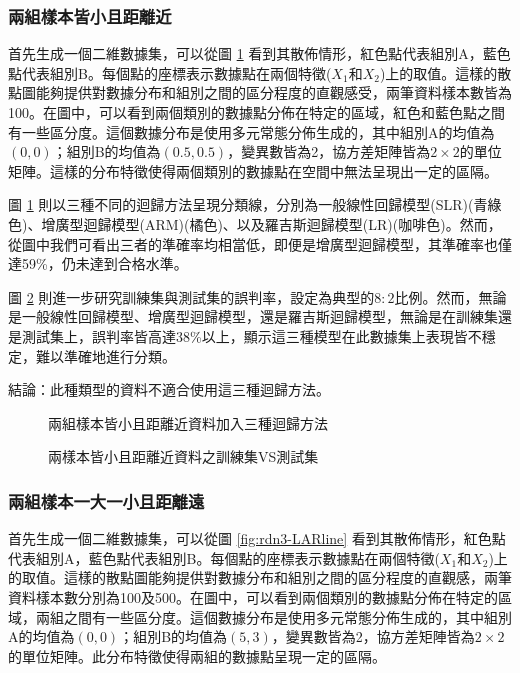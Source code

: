 \documentclass[12pt, a4paper]{article}
\begin{document}
\subsubsection{兩組樣本皆小且距離近}
首先生成一個二維數據集，可以從圖 \ref{fig:rdn2-LARline} 看到其散佈情形，紅色點代表組別A，藍色點代表組別B。每個點的座標表示數據點在兩個特徵($X_1$和$X_2$)上的取值。這樣的散點圖能夠提供對數據分布和組別之間的區分程度的直觀感受，兩筆資料樣本數皆為100。在圖中，可以看到兩個類別的數據點分佈在特定的區域，紅色和藍色點之間有一些區分度。這個數據分布是使用多元常態分佈生成的，其中組別A的均值為$(0, 0)$；組別B的均值為$(0.5, 0.5)$，變異數皆為2，協方差矩陣皆為$2 \times 2$的單位矩陣。這樣的分布特徵使得兩個類別的數據點在空間中無法呈現出一定的區隔。

圖 \ref{fig:rdn2-LARline} 則以三種不同的迴歸方法呈現分類線，分別為一般線性回歸模型(SLR)(青綠色)、增廣型迴歸模型(ARM)(橘色)、以及羅吉斯迴歸模型(LR)(咖啡色)。然而，從圖中我們可看出三者的準確率均相當低，即便是增廣型迴歸模型，其準確率也僅達59\%，仍未達到合格水準。

圖 \ref{fig:rdn2-LARline2} 則進一步研究訓練集與測試集的誤判率，設定為典型的$8:2$比例。然而，無論是一般線性回歸模型、增廣型迴歸模型，還是羅吉斯迴歸模型，無論是在訓練集還是測試集上，誤判率皆高達38\%以上，顯示這三種模型在此數據集上表現皆不穩定，難以準確地進行分類。

結論：此種類型的資料不適合使用這三種迴歸方法。
\begin{figure}[H]
    \caption{兩組樣本皆小且距離近資料加入三種迴歸方法}
    \label{fig:rdn2-LARline}
\end{figure}
\begin{figure}[H]
    \caption{兩樣本皆小且距離近資料之訓練集VS測試集}
    \label{fig:rdn2-LARline2}
\end{figure}
\subsubsection{兩組樣本一大一小且距離遠}
首先生成一個二維數據集，可以從圖 \ref{fig:rdn3-LARline} 看到其散佈情形，紅色點代表組別A，藍色點代表組別B。每個點的座標表示數據點在兩個特徵($X_1$和$X_2$)上的取值。這樣的散點圖能夠提供對數據分布和組別之間的區分程度的直觀感，兩筆資料樣本數分別為100及500。在圖中，可以看到兩個類別的數據點分佈在特定的區域，兩組之間有一些區分度。這個數據分布是使用多元常態分佈生成的，其中組別A的均值為$(0, 0)$；組別B的均值為$(5, 3)$，變異數皆為2，協方差矩陣皆為$2 \times 2$的單位矩陣。此分布特徵使得兩組的數據點呈現一定的區隔。
\end{document}

